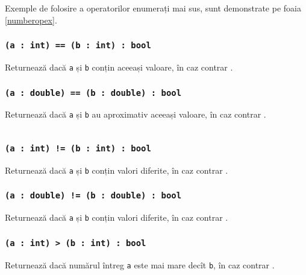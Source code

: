 Exemple de folosire a operatorilor enumerați mai sus, sunt demonstrate pe foaia \ref{numberopex}.

\subsubsection{\texttt{(a : int) == (b : int) : bool}}

Returnează \true{} dacă \texttt{a} și \texttt{b} conțin aceeași valoare, în caz contrar \false{}.

\subsubsection{\texttt{(a : double) == (b : double) : bool}}

Returnează \true{} dacă \texttt{a} și \texttt{b} au aproximativ aceeași valoare, în caz contrar \false{}.

\begin{sourcecode}
    \label{numberopex}
    \inputminted[linenos]{icl}{../sources/numberopex.icL}
\end{sourcecode}

\subsubsection{\texttt{(a : int) != (b : int) : bool}}

Returnează \true{} dacă \texttt{a} și \texttt{b} conțin valori diferite, în caz contrar \false{}.

\subsubsection{\texttt{(a : double) != (b : double) : bool}}

Returnează \true{} dacă \texttt{a} și \texttt{b} conțin valori diferite, în caz contrar \false{}.

\subsubsection{\texttt{(a : int) > (b : int) : bool}}

Returnează \true{} dacă numărul întreg \texttt{a} este mai mare decît \texttt{b}, în caz contrar \false{}.


